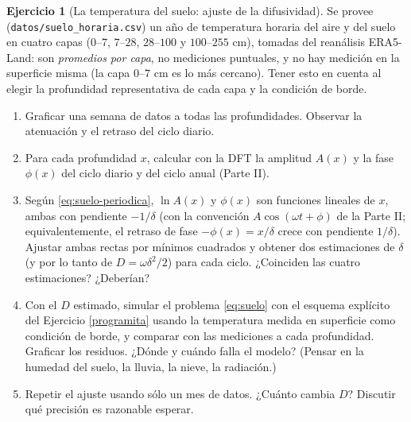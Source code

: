 \documentclass[12pt, a4paper]{amsbook}
\theoremstyle{remark}
\theoremstyle{definition}
\newtheorem{ejer}[teo]{Ejercicio}
\numberwithin{section}{chapter}
\numberwithin{subsection}{section}
\numberwithin{equation}{section}
\numberwithin{figure}{chapter}
\begin{document}
\begin{ejer}[La temperatura del suelo: ajuste de la difusividad]\label{lab:suelo}
Se provee (\nolinkurl{datos/suelo_horaria.csv}) un año de temperatura horaria del aire y del suelo en cuatro capas ($0$--$7$, $7$--$28$, $28$--$100$ y $100$--$255$ cm), tomadas del reanálisis ERA5-Land: son \emph{promedios por capa}, no mediciones puntuales, y no hay medición en la superficie misma (la capa $0$--$7$ cm es lo más cercano). Tener esto en cuenta al elegir la profundidad representativa de cada capa y la condición de borde.
\begin{enumerate}
\item Graficar una semana de datos a todas las profundidades. Observar la atenuación y el retraso del ciclo diario.
\item Para cada profundidad $x$, calcular con la DFT la amplitud $A(x)$ y la fase $\phi(x)$ del ciclo diario y del ciclo anual (Parte II).
\item Según \eqref{eq:suelo-periodica}, $\ln A(x)$ y $\phi(x)$ son funciones lineales de $x$, ambas con pendiente $-1/\delta$ (con la convención $A\cos(\omega t+\phi)$ de la Parte II; equivalentemente, el retraso de fase $-\phi(x)=x/\delta$ crece con pendiente $1/\delta$). Ajustar ambas rectas por mínimos cuadrados y obtener dos estimaciones de $\delta$ (y por lo tanto de $D = \omega\delta^2/2$) para cada ciclo. ¿Coinciden las cuatro estimaciones? ¿Deberían?
\item Con el $D$ estimado, simular el problema \eqref{eq:suelo} con el esquema explícito del Ejercicio \ref{programita} usando la temperatura medida en superficie como condición de borde, y comparar con las mediciones a cada profundidad. Graficar los residuos. ¿Dónde y cuándo falla el modelo? (Pensar en la humedad del suelo, la lluvia, la nieve, la radiación.)
\item Repetir el ajuste usando sólo un mes de datos. ¿Cuánto cambia $D$? Discutir qué precisión es razonable esperar.
\end{enumerate}
\end{ejer}
\end{document}
